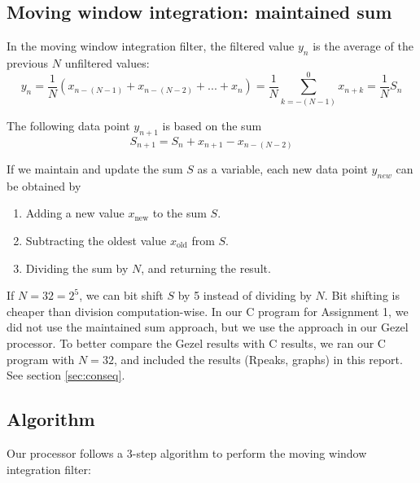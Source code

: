 \subsection{Moving window integration: maintained sum}
\label{sec:maintainedSum}

In the moving window integration filter, the filtered value $y_n$ is the average of the previous $N$ unfiltered values:
\begin{equation}
    y_n = \frac{1}{N} \left( x_{n- (N-1)}  + x_{n-(N-2)} + ... +  x_n \right) = \frac{1}{N} \sum_{k=-(N-1)}^{0} x_{n+k} = \frac{1}{N} S_n
\end{equation}

The following data point $y_{n+1}$ is based on the sum
\begin{equation}
    S_{n+1} = S_n + x_{n+1} - x_{n-(N-2)}
\end{equation}

If we maintain and update the sum $S$ as a variable, each new data point $y_{new}$ can be obtained by 
\begin{enumerate}
    \item Adding a new value $x_{\text{new}}$ to the sum $S$.
    \item Subtracting the oldest value $x_{\text{old}}$ from $S$.
    \item Dividing the sum by $N$, and returning the result.
\end{enumerate}

If $N=32 = 2^5$, we can bit shift $S$ by 5 instead of dividing by $N$. Bit shifting is cheaper than division computation-wise. In our C program for Assignment 1, we did not use the maintained sum approach, but we use the approach in our Gezel processor. To better compare the Gezel results with C results, we ran our C program with $N=32$, and included the results (Rpeaks, graphs) in this report. See section \ref{sec:conseq}.
\vspace{3cm}
\newpage
\subsection{Algorithm}
\label{sec:AlgIns}

Our processor follows a 3-step algorithm to perform the moving window integration filter:

